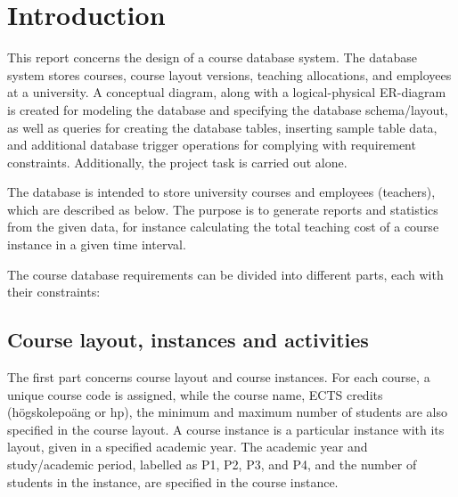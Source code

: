 \documentclass[a4paper]{scrartcl}
\renewcommand{\_}{\textunderscore\allowbreak}
\begin{document}



\section{Introduction}
\label{sec:introduction}


This report concerns the design of a course database system. The database system stores courses, course layout versions, teaching allocations, and employees at a university. A conceptual diagram, along with a logical-physical ER-diagram is created for modeling the database and specifying the database schema/layout, as well as queries for creating the database tables, inserting sample table data, and additional database trigger operations for complying with requirement constraints. Additionally, the project task is carried out alone.

The database is intended to store university courses and employees (teachers), which are described as below. The purpose is to generate reports and statistics from the given data, for instance calculating the total teaching cost of a course instance in a given time interval.

The course database requirements can be divided into different parts, each with their constraints:

\subsection{Course layout, instances and activities}
The first part concerns course layout and course instances. For each course, a unique course code is assigned, while the course name, ECTS credits (högskolepoäng or hp), the minimum and maximum number of students are also specified in the course layout. A course instance is a particular instance with its layout, given in a specified academic year. The academic year and study/academic period, labelled as P1, P2, P3, and P4, and the number of students in the instance, are specified in the course instance.
\end{document}
